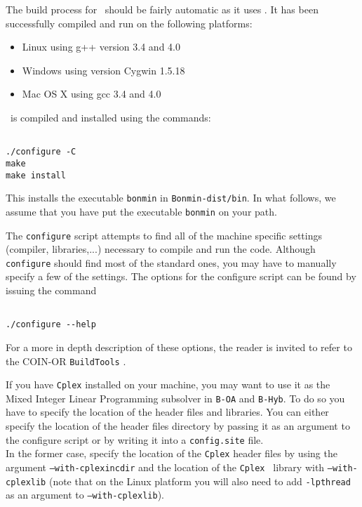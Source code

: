 The build process for \Bonmin\ should be fairly automatic as it uses
.
  It has been successfully compiled and run on the following platforms:
\begin{itemize}
\item Linux using g++ version 3.4 and 4.0
\item Windows using version Cygwin 1.5.18
\item Mac OS X using gcc 3.4 and 4.0
\end{itemize}
\Bonmin\ is compiled and installed using the commands:
\begin{verbatim}

./configure -C
make
make install

\end{verbatim}

This installs the executable {\tt bonmin} in {\tt Bonmin-dist/bin}. In what follows, we assume
that you have put the executable {\tt bonmin} on your path.

The {\tt configure} script attempts to find all of the machine specific settings (compiler, libraries,...)
necessary to compile and run the code. Although {\tt configure} should find most of the standard
ones, you may have to manually specify a few of the settings.
The options for the configure script can be found by issuing the command
\begin{verbatim}

./configure --help

\end{verbatim}
For a more in depth description of these options,
the reader is invited to refer to the COIN-OR {\tt BuildTools} .

If you have {\tt Cplex} installed on your machine, you may want to use it
as the Mixed Integer Linear Programming subsolver in {\tt B-OA} and {\tt B-Hyb}.
To do so you have to specify the location of the header files and libraries.
You can either specify the location of the header files directory by passing it as an
argument to the configure script or by writing it into a {\tt config.site} file.\\

In the former case, specify the location of the {\tt Cplex} header files by using the
argument {\tt --with-cplexincdir} and the location of the
{\tt Cplex } library with {\tt --with-cplexlib} (note that on the Linux platform you will also
need to add {\tt -lpthread} as an argument to {\tt --with-cplexlib}).\\

